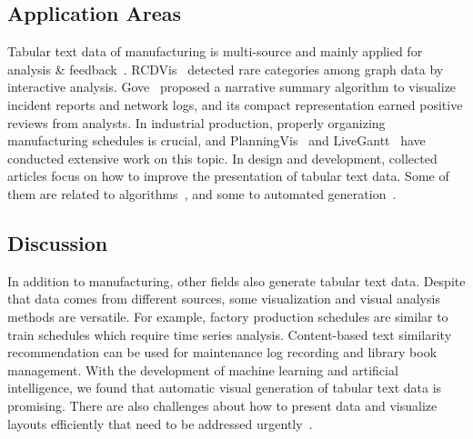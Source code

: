 \documentclass[a4paper,fleqn]{cas-dc}
\begin{document}
\subsection{Application Areas}
Tabular text data of manufacturing is multi-source and mainly applied for analysis \& feedback~\cite{Gove,Mei2019,sun2019planningvis,Wang2018}.
RCDVis~\cite{Qian2022} detected rare categories among graph data  by interactive analysis.
Gove~\cite{Gove} proposed a narrative summary algorithm to visualize incident reports and network logs, and its compact representation earned positive reviews from analysts.
In industrial production, properly organizing manufacturing schedules is crucial, and PlanningVis~\cite{sun2019planningvis} and LiveGantt~\cite{Jo2014} have conducted extensive work on this topic.
In design and development, collected articles focus on how to improve the presentation of tabular text data. Some of them are related to algorithms~\cite{Bartram2022,McNutt2021,Mei2019}, and some to automated generation~\cite{Liu2021,Wang}.

\subsection{Discussion}
In addition to manufacturing, other fields also generate tabular text data. Despite that data comes from different sources, some visualization and visual analysis methods are versatile.
For example, factory production schedules are similar to train schedules which require time series analysis. Content-based text similarity recommendation can be used for maintenance log recording and library book management.
With the development of machine learning and artificial intelligence, we found that automatic visual generation of tabular text data is promising.
There are also challenges about how to present data and visualize layouts efficiently that need to be addressed urgently~\cite{Blumenschein2018,Mei2019}.
\end{document}
